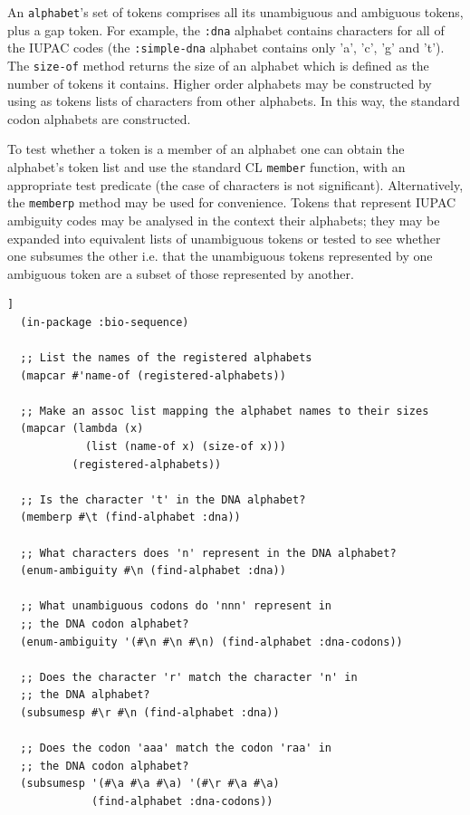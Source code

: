\documentclass[a4paper, 12pt]{article}
\begin{document}
An \lstinline!alphabet!'s set of tokens comprises all its unambiguous
and ambiguous tokens, plus a gap token. For example, the
\lstinline!:dna! alphabet contains characters for all of the IUPAC
codes (the \lstinline!:simple-dna! alphabet contains only 'a', 'c',
'g' and 't'). The \lstinline!size-of! method returns the size of an
alphabet which is defined as the number of tokens it contains. Higher
order alphabets may be constructed by using as tokens lists of
characters from other alphabets. In this way, the standard codon
alphabets are constructed.

To test whether a token is a member of an alphabet one can obtain the
alphabet's token list and use the standard CL \lstinline!member!
function, with an appropriate test predicate (the case of characters
is not significant). Alternatively, the \lstinline!memberp! method may
be used for convenience. Tokens that represent IUPAC ambiguity codes
may be analysed in the context their alphabets; they may be expanded
into equivalent lists of unambiguous tokens or tested to see whether
one subsumes the other i.e. that the unambiguous tokens represented by
one ambiguous token are a subset of those represented by another.

\begin{lstlisting}[caption={Using bio-sequence alphabets},
  label=lst:using-bioseq-alphabets,float=[tbph]]
  (in-package :bio-sequence)
  
  ;; List the names of the registered alphabets
  (mapcar #'name-of (registered-alphabets))

  ;; Make an assoc list mapping the alphabet names to their sizes
  (mapcar (lambda (x)
            (list (name-of x) (size-of x)))
          (registered-alphabets))

  ;; Is the character 't' in the DNA alphabet?
  (memberp #\t (find-alphabet :dna))

  ;; What characters does 'n' represent in the DNA alphabet?
  (enum-ambiguity #\n (find-alphabet :dna))

  ;; What unambiguous codons do 'nnn' represent in
  ;; the DNA codon alphabet?
  (enum-ambiguity '(#\n #\n #\n) (find-alphabet :dna-codons))

  ;; Does the character 'r' match the character 'n' in
  ;; the DNA alphabet?
  (subsumesp #\r #\n (find-alphabet :dna))

  ;; Does the codon 'aaa' match the codon 'raa' in
  ;; the DNA codon alphabet?
  (subsumesp '(#\a #\a #\a) '(#\r #\a #\a)
             (find-alphabet :dna-codons))
\end{lstlisting}
\end{document}

